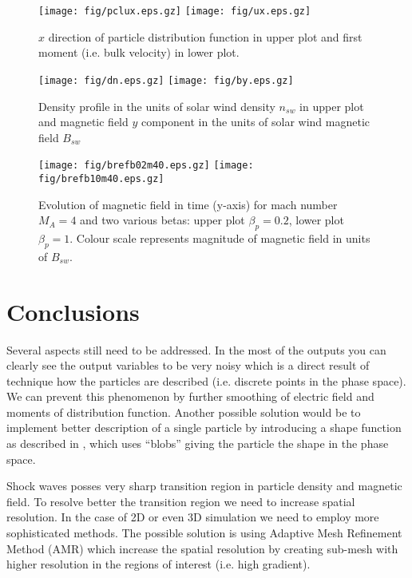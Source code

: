 \documentclass[oneside,branding,toc,article]{satdoc}
\begin{document}
\begin{figure}[!h]
  \centering
  \texttt{[image: fig/pclux.eps.gz]}
  \texttt{[image: fig/ux.eps.gz]}
  \caption{$x$ direction of particle distribution function in upper plot and
    first moment (i.e. bulk velocity) in lower plot. }
  \label{fig:dist}
\end{figure}

\begin{figure}[!h]
  \centering
  \texttt{[image: fig/dn.eps.gz]}
  \texttt{[image: fig/by.eps.gz]}
  \caption{Density profile in the units of solar wind density $n_{sw}$ in upper
    plot and magnetic field $y$ component in the units of solar wind magnetic
    field $B_{sw}$}
  \label{fig:dnby}
\end{figure}

\begin{figure}[!h]
  \centering
  \texttt{[image: fig/brefb02m40.eps.gz]}
  \texttt{[image: fig/brefb10m40.eps.gz]}
  \caption{Evolution of magnetic field in time (y-axis) for mach number $M_A =
    4$ and two various betas: upper plot $\beta_p = 0.2$, lower plot $\beta_p =
    1$. Colour scale represents magnitude of magnetic field in units of
    $B_{sw}$. }
  \label{fig:bref}
\end{figure}

\section{Conclusions}
Several aspects still need to be addressed.  In the most of the outputs you can
clearly see the output variables to be very noisy which is a direct result of
technique how the particles are described (i.e. discrete points in the phase
space).  We can prevent this phenomenon by further smoothing of electric field
and moments of distribution function.  Another possible solution would be to
implement better description of a single particle by introducing a shape
function as described in \cite{coppea96}, which uses ``blobs'' giving the
particle the shape in the phase space.

Shock waves posses very sharp transition region in particle density and
magnetic field.  To resolve better the transition region we need to increase
spatial resolution.  In the case of 2D or even 3D simulation we need to employ
more sophisticated methods.  The possible solution is using Adaptive Mesh
Refinement Method (AMR) which increase the spatial resolution by creating
sub-mesh with higher resolution in the regions of interest (i.e. high
gradient).
\end{document}
